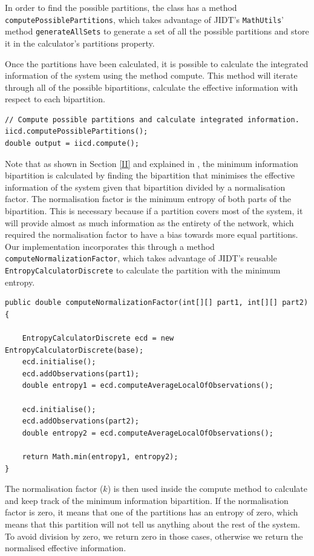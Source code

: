 \documentclass[a4paper,11pt]{article}
\begin{document}
In order to find the possible partitions, the class has a method \texttt{computePossiblePartitions}, which takes advantage of JIDT's \texttt{MathUtils}' method \texttt{generateAllSets} to generate a set of all the possible partitions and store it in the calculator's partitions property.

Once the partitions have been calculated, it is possible to calculate the integrated information of the system using the method compute. This method will iterate through all of the possible bipartitions, calculate the effective information with respect to each bipartition.

\begin{verbatim}
// Compute possible partitions and calculate integrated information.
iicd.computePossiblePartitions();
double output = iicd.compute();
\end{verbatim}

Note that as shown in Section \ref{II} and explained in \cite{Barrett2011}, the minimum information bipartition is calculated by finding the bipartition that minimises the effective information of the system given that bipartition divided by a normalisation factor. The normalisation factor is the minimum entropy of both parts of the bipartition. This is necessary because if a partition covers most of the system, it will provide almost as much information as the entirety of the network, which required the normalisation factor to have a bias towards more equal partitions. Our implementation incorporates this through a method \texttt{computeNormalizationFactor}, which takes advantage of JIDT's reusable \texttt{EntropyCalculatorDiscrete} to calculate the partition with the minimum entropy.

\begin{verbatim}
public double computeNormalizationFactor(int[][] part1, int[][] part2) {

	EntropyCalculatorDiscrete ecd = new EntropyCalculatorDiscrete(base);
	ecd.initialise();
	ecd.addObservations(part1);
	double entropy1 = ecd.computeAverageLocalOfObservations();

	ecd.initialise();
	ecd.addObservations(part2);
	double entropy2 = ecd.computeAverageLocalOfObservations();

	return Math.min(entropy1, entropy2);
}
\end{verbatim}

The normalisation factor ($k$) is then used inside the compute method to calculate and keep track of the minimum information bipartition. If the normalisation factor is zero, it means that one of the partitions has an entropy of zero, which means that this partition will not tell us anything about the rest of the system. To avoid division by zero, we return zero in those cases, otherwise we return the normalised effective information.
\end{document}
